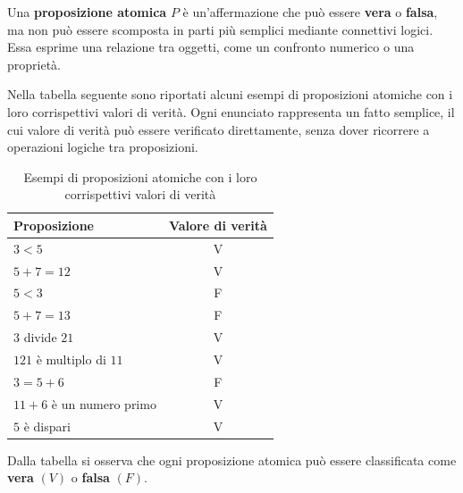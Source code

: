 {
Una \textbf{proposizione atomica} $P$ è un'affermazione che può essere \textbf{vera} o \textbf{falsa}, ma non può essere scomposta in parti più semplici mediante connettivi logici. Essa esprime una relazione tra oggetti, come un confronto numerico o una proprietà.
}
\begin{esempio}
Nella tabella seguente  sono riportati alcuni esempi di proposizioni atomiche  con i loro corrispettivi valori di verità. Ogni enunciato rappresenta un fatto semplice, il cui valore di verità può essere verificato direttamente, senza dover ricorrere a operazioni logiche tra proposizioni.
\begin{table}[h!]
\centering
\begin{tabular}{|l|c|}
\hline
\textbf{Proposizione} & \textbf{Valore di verità} \\
\hline
$3 < 5$ & V \\
$5 + 7 = 12$ & V \\
$5 < 3$ & F \\
$5 + 7 = 13$ & F \\
$3$ divide $21$ & V \\
$121$ è multiplo di $11$ & V \\
$3 = 5 + 6$ & F \\
$11 + 6$ è un numero primo & V \\
$5$ è dispari & V \\
\hline
\end{tabular}
\caption{Esempi di proposizioni atomiche con i  loro corrispettivi valori di  verità}
\end{table}

\noindent Dalla tabella si osserva che ogni proposizione atomica può essere classificata come \textbf{vera} $(V)$ o \textbf{falsa} $(F)$.

\end{esempio}


